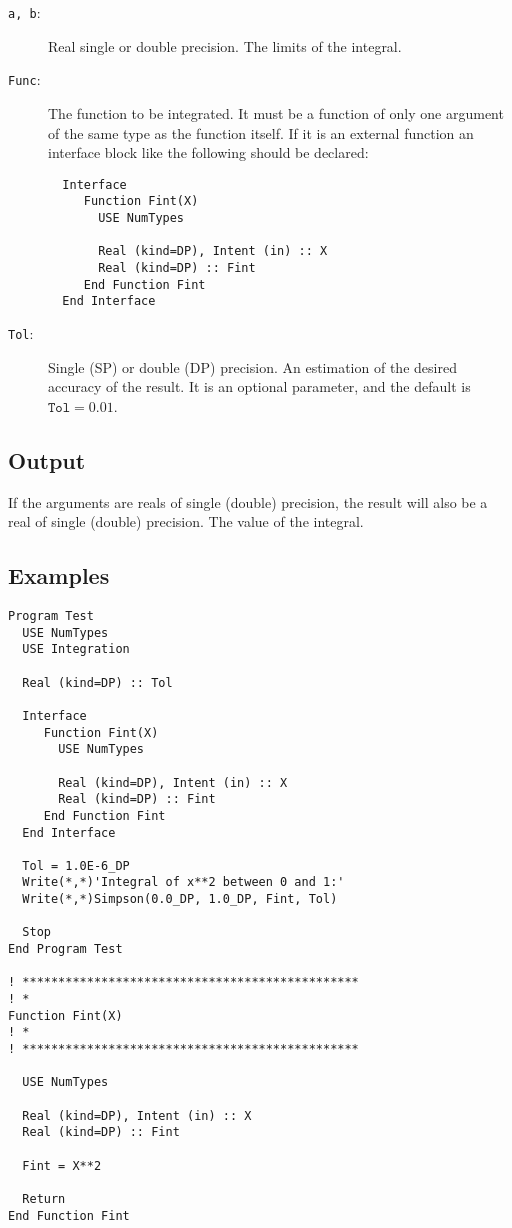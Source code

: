 \begin{description}
\item[\texttt{a, b}:] Real single or double precision. The limits of
  the integral. 
\item[\texttt{Func}:] The function to be integrated. It must be a
  function of only one argument of the same type as the function
  itself. If it is an
  external function an interface block like the following should be
  declared: 
\begin{verbatim}
  Interface 
     Function Fint(X)
       USE NumTypes

       Real (kind=DP), Intent (in) :: X
       Real (kind=DP) :: Fint
     End Function Fint
  End Interface
\end{verbatim}
\item[\texttt{Tol}:] Single (SP) or double (DP) precision. An
  estimation of the desired accuracy of the result. It is an optional
  parameter, and the default is $\mathtt{Tol} = 0.01$. 
\end{description}


\subsection{Output}

If the arguments are reals of single (double) precision, the result
will also be a real of single (double) precision. The value of the
integral. 


\subsection{Examples}

\begin{verbatim}
Program Test
  USE NumTypes
  USE Integration

  Real (kind=DP) :: Tol

  Interface 
     Function Fint(X)
       USE NumTypes

       Real (kind=DP), Intent (in) :: X
       Real (kind=DP) :: Fint
     End Function Fint
  End Interface

  Tol = 1.0E-6_DP
  Write(*,*)'Integral of x**2 between 0 and 1:'
  Write(*,*)Simpson(0.0_DP, 1.0_DP, Fint, Tol)

  Stop
End Program Test

! ***********************************************
! *
Function Fint(X)
! *  
! ***********************************************

  USE NumTypes

  Real (kind=DP), Intent (in) :: X
  Real (kind=DP) :: Fint

  Fint = X**2

  Return
End Function Fint
\end{verbatim}

